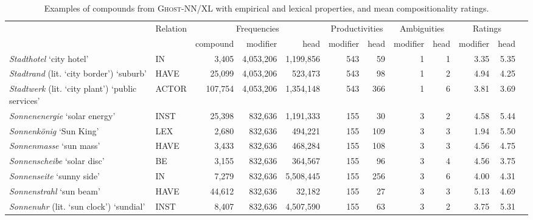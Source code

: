 \documentclass[output=paper,colorlinks,citecolor=brown]{langscibook}
\begin{document}
\begin{sidewaystable}

\caption{Examples of compounds from \textsc{Ghost-NN/XL} with empirical and lexical properties, and mean compositionality ratings.}
\label{tab:ex-ghost}
\scriptsize
  \begin{tabularx}{\textwidth}{llrrrrrrrrrr}
  \lsptoprule

      \multicolumn{1}{c}{Compounds} &
      {Relation} & \multicolumn{3}{c}{Frequencies} & \multicolumn{2}{c}{Productivities} & \multicolumn{2}{c}{Ambiguities} & \multicolumn{2}{c}{Ratings} \\
      \cmidrule{3-11}
      & & compound & modifier & head & modifier & head & modifier & head & modifier & head \\

       \midrule

      \textit{Stadthotel} `city hotel' & IN & 3,405 & 4,053,206 & 1,199,856 & 543 & 59 & 1 & 1 & 3.35 & 5.35 \\
      \textit{Stadtrand} (lit. `city border') `suburb' & HAVE & 25,099 & 4,053,206 &   523,473 & 543 &  98 & 1 & 2 & 4.94 & 4.25 \\
      \textit{Stadtwerk} (lit. `city plant') `public services' & ACTOR & 107,754 & 4,053,206 & 1,354,148 & 543 & 366 & 1 & 6 & 3.81 & 3.69 \\
      \midrule

      \textit{Sonnenenergie} `solar energy' & INST & 25,398 & 832,636 & 1,191,333 & 155 & 30 & 3 & 2 & 4.58 & 5.44 \\
      \textit{Sonnenkönig} `Sun King' & LEX & 2,680 & 832,636 & 494,221 & 155 & 109 & 3 & 3 & 1.94 & 5.50 \\
      \textit{Sonnenmasse} `sun mass' & HAVE & 3,433 & 832,636 & 468,284 & 155 & 108 & 3 & 3 & 4.56 & 4.75 \\
      \textit{Sonnenscheibe} `solar disc' & BE & 3,155 & 832,636 & 364,567 & 155 & 96 & 3 & 4 & 4.56 & 3.75 \\
      \textit{Sonnenseite} `sunny side' & IN & 7,279 & 832,636 & 5,508,445 & 155 & 256 & 3 & 6 & 4.00 & 4.31 \\
      \textit{Sonnenstrahl} `sun beam' & HAVE & 44,612 & 832,636 & 32,182 & 155 & 27 & 3 & 3 & 5.13 & 4.69 \\
      \textit{Sonnenuhr} (lit. `sun clock') `sundial' & INST & 8,407 & 832,636 & 4,507,590 & 155 & 63 & 3 & 2 & 3.75 & 5.31 \\
       \midrule


\end{tabularx}
\end{sidewaystable}
\end{document}
